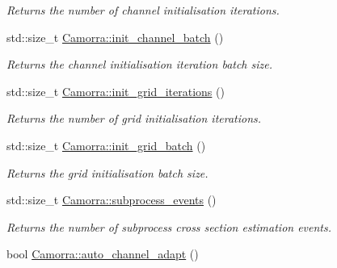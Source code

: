 \begin{DoxyCompactItemize}
\begin{DoxyCompactList}\small\item\em Returns the number of channel initialisation iterations. \end{DoxyCompactList}\item 
\hypertarget{a00798_a55c0fe1561bc9cf86d32b2e0619af248}{
std::size\_\-t \hyperlink{a00798_a55c0fe1561bc9cf86d32b2e0619af248}{Camorra::init\_\-channel\_\-batch} ()}
\label{a00798_a55c0fe1561bc9cf86d32b2e0619af248}

\begin{DoxyCompactList}\small\item\em Returns the channel initialisation iteration batch size. \end{DoxyCompactList}\item 
\hypertarget{a00798_a7099f4be7379b50523119d1ecbe1e48e}{
std::size\_\-t \hyperlink{a00798_a7099f4be7379b50523119d1ecbe1e48e}{Camorra::init\_\-grid\_\-iterations} ()}
\label{a00798_a7099f4be7379b50523119d1ecbe1e48e}

\begin{DoxyCompactList}\small\item\em Returns the number of grid initialisation iterations. \end{DoxyCompactList}\item 
\hypertarget{a00798_a488455fe84957f9249d705f5914da34a}{
std::size\_\-t \hyperlink{a00798_a488455fe84957f9249d705f5914da34a}{Camorra::init\_\-grid\_\-batch} ()}
\label{a00798_a488455fe84957f9249d705f5914da34a}

\begin{DoxyCompactList}\small\item\em Returns the grid initialisation batch size. \end{DoxyCompactList}\item 
\hypertarget{a00798_ac4c5254a693a8917059b098648f56ccd}{
std::size\_\-t \hyperlink{a00798_ac4c5254a693a8917059b098648f56ccd}{Camorra::subprocess\_\-events} ()}
\label{a00798_ac4c5254a693a8917059b098648f56ccd}

\begin{DoxyCompactList}\small\item\em Returns the number of subprocess cross section estimation events. \end{DoxyCompactList}\item 
\hypertarget{a00798_a9f20e2a090436db910851c6b4b37bed4}{
bool \hyperlink{a00798_a9f20e2a090436db910851c6b4b37bed4}{Camorra::auto\_\-channel\_\-adapt} ()}
\label{a00798_a9f20e2a090436db910851c6b4b37bed4}


\end{DoxyCompactItemize}
